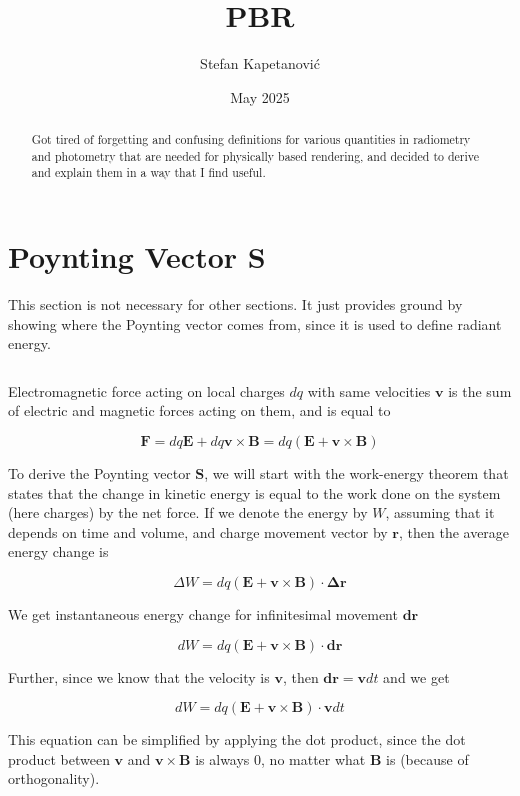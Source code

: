 \documentclass{article}
\title{PBR}
\author{Stefan Kapetanović}
\date{May 2025}
\begin{document}
\maketitle

\begin{abstract}
Got tired of forgetting and confusing definitions for various quantities in radiometry and photometry that are needed for physically based rendering, and decided to derive and explain them in a way that I find useful.
\end{abstract}

\section{Poynting Vector S}

This section is not necessary for other sections. It just provides ground by showing where the Poynting vector comes from, since it is used to define radiant energy.

\[\]

Electromagnetic force acting on local charges $dq$ with same velocities $\mathbf{v}$ is the sum of electric and magnetic forces acting on them, and is equal to

\[ \mathbf{F} = dq\mathbf{E} + dq\mathbf{v} \times \mathbf{B} = dq(\mathbf{E} + \mathbf{v} \times \mathbf{B}) \]

To derive the Poynting vector $\mathbf{S}$, we will start with the work-energy theorem that states that the change in kinetic energy is equal to the work done on the system (here charges) by the net force. If we denote the energy by $W$, assuming that it depends on time and volume, and charge movement vector by $\mathbf{r}$, then the average energy change is

\[ \Delta W = dq(\mathbf{E} + \mathbf{v} \times \mathbf{B}) \cdot \mathbf{\Delta r} \]

We get instantaneous energy change for infinitesimal movement $\mathbf{dr}$

\[ dW = dq(\mathbf{E} + \mathbf{v} \times \mathbf{B}) \cdot \mathbf{dr} \]

Further, since we know that the velocity is $\mathbf{v}$, then $\mathbf{dr} = \mathbf{v}dt$ and we get

\[ dW = dq(\mathbf{E} + \mathbf{v} \times \mathbf{B}) \cdot \mathbf{v}dt \]

This equation can be simplified by applying the dot product, since the dot product between $\mathbf{v}$ and $\mathbf{v} \times \mathbf{B}$ is always 0, no matter what $\mathbf{B}$ is (because of orthogonality).
\end{document}
